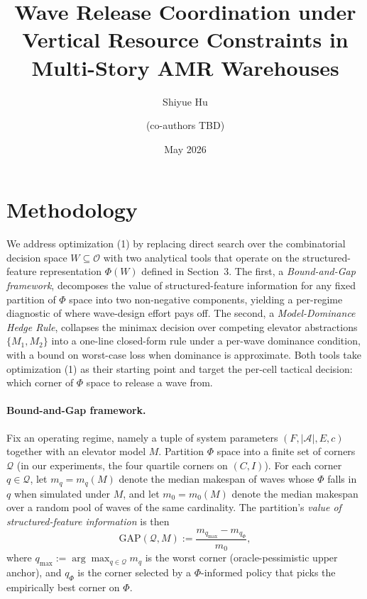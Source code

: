 \documentclass[11pt, a4paper]{article}
\title{Wave Release Coordination under Vertical Resource Constraints in Multi-Story AMR Warehouses}
\author{Shiyue Hu \and (co-authors TBD)}
\date{May 2026}
\theoremstyle{definition}
\begin{document}
\maketitle

\section{Methodology}\label{sec:methodology}

We address optimization (1) by replacing direct search over the combinatorial decision space $W \subseteq \mathcal{O}$ with two analytical tools that operate on the structured-feature representation $\Phi(W)$ defined in Section~3. The first, a \emph{Bound-and-Gap framework}, decomposes the value of structured-feature information for any fixed partition of $\Phi$ space into two non-negative components, yielding a per-regime diagnostic of where wave-design effort pays off. The second, a \emph{Model-Dominance Hedge Rule}, collapses the minimax decision over competing elevator abstractions $\{M_1, M_2\}$ into a one-line closed-form rule under a per-wave dominance condition, with a bound on worst-case loss when dominance is approximate. Both tools take optimization (1) as their starting point and target the per-cell tactical decision: which corner of $\Phi$ space to release a wave from.

\paragraph{Bound-and-Gap framework.} Fix an operating regime, namely a tuple of system parameters $(F, |\mathcal{A}|, E, c)$ together with an elevator model $M$. Partition $\Phi$ space into a finite set of corners $\mathcal{Q}$ (in our experiments, the four quartile corners on $(C, I)$). For each corner $q \in \mathcal{Q}$, let $m_q = m_q(M)$ denote the median makespan of waves whose $\Phi$ falls in $q$ when simulated under $M$, and let $m_0 = m_0(M)$ denote the median makespan over a random pool of waves of the same cardinality. The partition's \emph{value of structured-feature information} is then
\begin{equation}\label{eq:gap-def}\tag{7}
\text{GAP}(\mathcal{Q}, M) := \frac{m_{q_{\max}} - m_{q_\Phi}}{m_0},
\end{equation}
where $q_{\max} := \arg\max_{q \in \mathcal{Q}} m_q$ is the worst corner (oracle-pessimistic upper anchor), and $q_\Phi$ is the corner selected by a $\Phi$-informed policy that picks the empirically best corner on $\Phi$.
\end{document}
